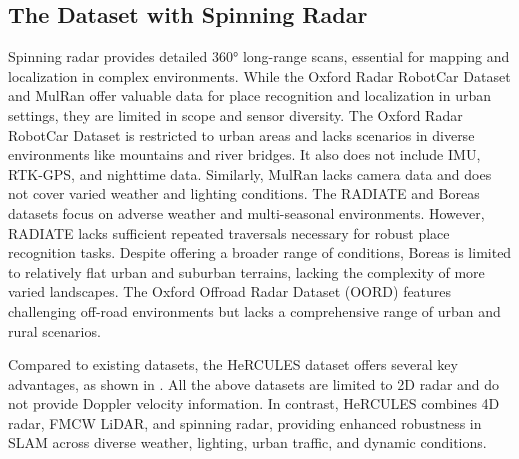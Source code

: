 

\subsection{The Dataset with Spinning Radar}
Spinning radar provides detailed 360° long-range scans, essential for mapping and localization in complex environments. While the Oxford Radar RobotCar Dataset \cite{barnes2020oxford} and MulRan \cite{kim2020mulran} offer valuable data for place recognition and localization in urban settings, they are limited in scope and sensor diversity. The Oxford Radar RobotCar Dataset is restricted to urban areas and lacks scenarios in diverse environments like mountains and river bridges. It also does not include \ac{IMU}, RTK-GPS, and nighttime data. Similarly, MulRan lacks camera data and does not cover varied weather and lighting conditions. The RADIATE \cite{sheeny2021radiate} and Boreas \cite{burnett2023boreas} datasets focus on adverse weather and multi-seasonal environments. However, RADIATE lacks sufficient repeated traversals necessary for robust place recognition tasks. Despite offering a broader range of conditions, Boreas is limited to relatively flat urban and suburban terrains, lacking the complexity of more varied landscapes. The Oxford Offroad Radar Dataset (OORD) \cite{gadd2024oord} features challenging off-road environments but lacks a comprehensive range of urban and rural scenarios.

Compared to existing datasets, the HeRCULES dataset offers several key advantages, as shown in . All the above datasets are limited to 2D radar and do not provide Doppler velocity information. In contrast, HeRCULES combines 4D radar, \ac{FMCW} \ac{LiDAR}, and spinning radar, providing enhanced robustness in SLAM across diverse weather, lighting, urban traffic, and dynamic conditions.
